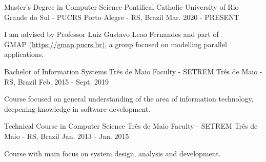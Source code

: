 
\begin{cventries}
  \cventry
  {Master's Degree in Computer Science} %
  {Pontifical Catholic University of Rio Grande do Sul - PUCRS} %
  {Porto Alegre - RS, Brazil} %
  {Mar. 2020 - PRESENT} %
  {
    \begin{cvitems} %
      \item {I am advised by Professor Luiz Gustavo Leao Fernandes and part of\\GMAP (\href{https://gmap.pucrs.br}{https://gmap.pucrs.br}), a group focused on modelling parallel applications.}
    \end{cvitems}
  }

  \cventry
  {Bachelor of Information Systems} %
  {Três de Maio Faculty - SETREM} %
  {Três de Maio - RS, Brazil} %
  {Feb. 2015 - Sept. 2019} %
  {
    \begin{cvitems} %
      \item {Course focused on general understanding of the area of information technology,\\deepening knowledge in software development.}
    \end{cvitems}
  }

  \cventry
  {Technical Course in Computer Science} %
  {Três de Maio Faculty - SETREM} %
  {Três de Maio - RS, Brazil} %
  {Jan. 2013 - Jan. 2015} %
  {
    \begin{cvitems} %
      \item {Course with main focus on system design, analysis and development.}
    \end{cvitems}
  }
\end{cventries}
